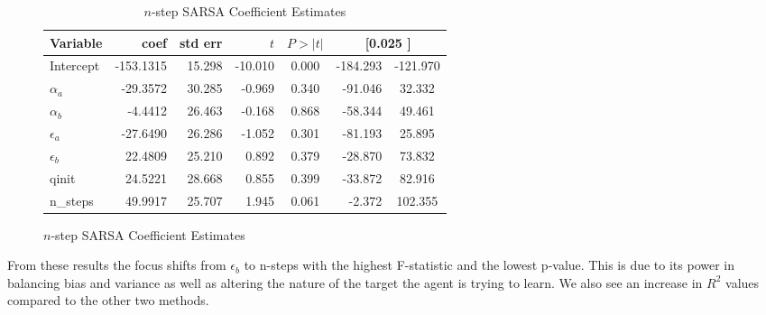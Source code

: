 \documentclass{article}
\begin{document}
\begin{table}[htbp]
   \begin{subfigure}[b]{0.9\textwidth}
        \centering
        \caption{$n$-step SARSA Coefficient Estimates}
        \label{tab:nstep_ols_coefficients}
        \begin{tabular}{lrrrcrc}
            \toprule
            \textbf{Variable} & \textbf{coef} & \textbf{std err} & \textbf{$t$} & \textbf{$P>|t|$} & \multicolumn{2}{c}{\textbf{[0.025 \quad 0.975]}} \\ 
            \midrule
            Intercept & -153.1315 & 15.298 & -10.010 & 0.000 & -184.293 & -121.970 \\
            $\alpha_a$ & -29.3572 & 30.285 & -0.969 & 0.340 & -91.046 & 32.332 \\
            $\alpha_b$ & -4.4412 & 26.463 & -0.168 & 0.868 & -58.344 & 49.461 \\
            $\epsilon_a$ & -27.6490 & 26.286 & -1.052 & 0.301 & -81.193 & 25.895 \\
            $\epsilon_b$ & 22.4809 & 25.210 & 0.892 & 0.379 & -28.870 & 73.832 \\
            qinit & 24.5221 & 28.668 & 0.855 & 0.399 & -33.872 & 82.916 \\
            n\_steps & 49.9917 & 25.707 & 1.945 & 0.061 & -2.372 & 102.355 \\ 
            \bottomrule
        \end{tabular}
    \end{subfigure}

\end{table}
\newpage
From these results the focus shifts from $\epsilon_b$ to n-steps with the highest F-statistic and the lowest p-value. This is due to its power in balancing bias and variance as well as altering the nature of the target the agent is trying to learn. We also see an increase in $R^2$ values compared to the other two methods.
\end{document}
